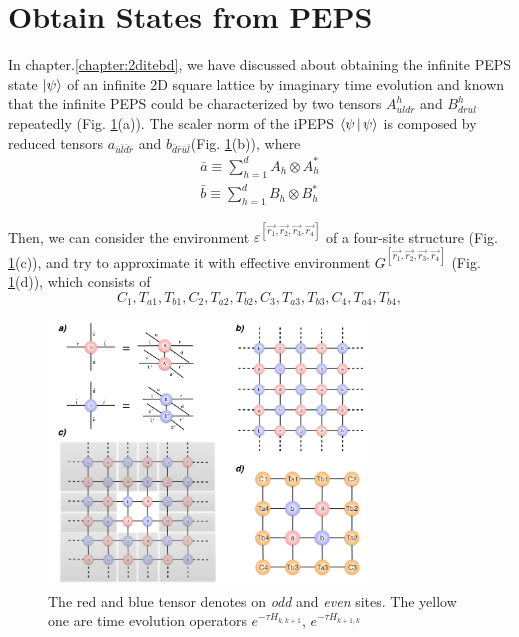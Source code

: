 \section{Obtain States from PEPS}
\label{2ditebdctm}
In chapter.\ref{chapter:2ditebd}, we have discussed about obtaining the infinite PEPS state $\Ket{\psi}$ of an infinite 2D square lattice by imaginary time evolution and known that the infinite PEPS could be characterized by two tensors $A^h_{uldr}$ and $B^h_{drul}$ repeatedly (Fig. \ref{fig511}(a)). The scaler norm of the iPEPS $\Braket{\psi|\psi}$ is composed by reduced tensors $a_{\bar{u}\bar{l}\bar{d}\bar{r}}$ and $b_{\bar{d}\bar{r}\bar{u}\bar{l}}$(Fig. \ref{fig511}(b)), where
\begin{align}
	\label{reduce_a}
	\bar{a} \equiv \sum_{h=1}^{d} A_{h} \otimes A^{*}_{h} \\
	\label{reduce_b}
	\bar{b} \equiv \sum_{h=1}^{d} B_{h} \otimes B^{*}_{h}
\end{align}

Then, we can consider the environment $\varepsilon^{\left[\vec{r_1},\vec{r_2},\vec{r_3},\vec{r_4}\right]}$ of a four-site structure (Fig. \ref{fig511}(c)), and try to approximate it with effective environment $G^{\left[\vec{r_1},\vec{r_2},\vec{r_3},\vec{r_4}\right]}$ (Fig. \ref{fig511}(d)), which consists of $$C_1, T_{a1}, T_{b1},C_2, T_{a2}, T_{b2},C_3, T_{a3}, T_{b3},C_4, T_{a4}, T_{b4},$$
\begin{figure}[ht]
	\centering
	\includegraphics[width=0.75\textwidth]{figures/fig511.png}
	\caption[The picture of the main idea of itebd.]{The red and blue tensor denotes on \textit{odd} and \textit{even} sites. The yellow one are time evolution operators $e^{-\tau H_{k,k+1}}$, $e^{-\tau H_{k+1,k}}$}
	\label{fig511}
\end{figure}

